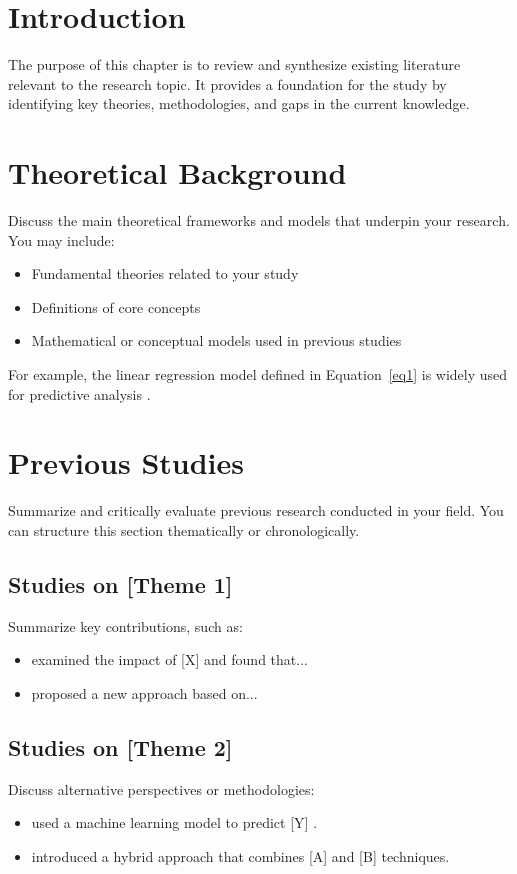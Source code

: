 \section{Introduction}
The purpose of this chapter is to review and synthesize existing literature relevant to the research topic. It provides a foundation for the study by identifying key theories, methodologies, and gaps in the current knowledge.

\section{Theoretical Background}
Discuss the main theoretical frameworks and models that underpin your research. You may include:
\begin{itemize}
    \item Fundamental theories related to your study
    \item Definitions of core concepts
    \item Mathematical or conceptual models used in previous studies
\end{itemize}

For example, the linear regression model defined in Equation~\ref{eq1} is widely used for predictive analysis \cite{Si86}.

\section{Previous Studies}
Summarize and critically evaluate previous research conducted in your field. You can structure this section thematically or chronologically.

\subsection{Studies on [Theme 1]}
Summarize key contributions, such as:
\begin{itemize}
    \item \citeauthor{Te80} \cite{Te80} examined the impact of [X] and found that...
    \item \citeauthor{ro95} \cite{ro95} proposed a new approach based on...
\end{itemize}

\subsection{Studies on [Theme 2]}
Discuss alternative perspectives or methodologies:
\begin{itemize}
    \item [Author1] used a machine learning model to predict [Y] \cite{Het16}.
    \item [Author2] introduced a hybrid approach that combines [A] and [B] techniques.
\end{itemize}

